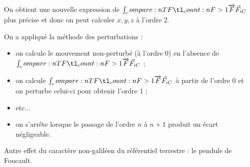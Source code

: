 On obtient une nouvelle expression de \(\v{F}_{iC}\) plus précise et donc on peut calculer \(x,y,z\) à l'ordre 2.

On a appliqué la méthode des perturbations :

\begin{itemize}
    \item on calcule le mouvement non-perturbé (à l'ordre 0) en l'absence de \(\v{F}_{iC}\) ; \\
    \item on calcule \(\v{F}_{iC}\) à partir de l'ordre 0 et on perturbe celui-ci pour obtenir l'ordre 1 ; \\
    \item etc... \\
    \item on s'arrête lorsque le passage de l'ordre \(n\) à \(n+1\) produit un écart négligeable.
\end{itemize}

Autre effet du caractère non-galiléen du référentiel terrestre : le pendule de Foucault.
